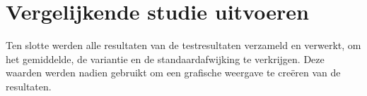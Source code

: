 \section{Vergelijkende studie uitvoeren}
Ten slotte werden alle resultaten van de testresultaten verzameld en verwerkt, om het gemiddelde, de variantie en de standaardafwijking te verkrijgen. Deze waarden werden nadien gebruikt om een grafische weergave te creëren van de resultaten.